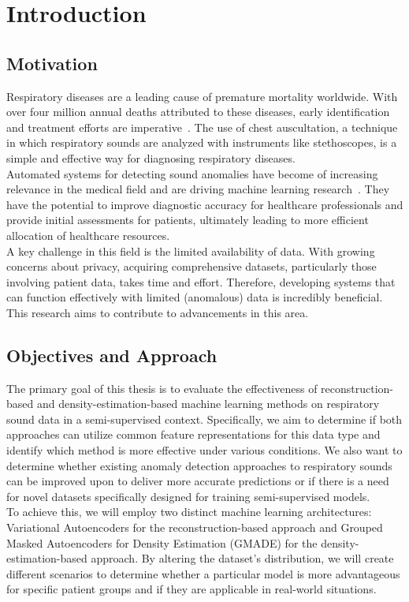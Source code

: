 \cleardoubleoddpage%
\chapter{Introduction}

\section{Motivation}
Respiratory diseases are a leading cause of premature mortality worldwide. With over four million annual deaths attributed to these diseases, early identification and treatment efforts are imperative~\cite{ferkol2014global}. The use of chest auscultation, a technique in which respiratory sounds are analyzed with instruments like stethoscopes, is a simple and effective way for diagnosing respiratory diseases.\\
Automated systems for detecting sound anomalies have become of increasing relevance in the medical field and are driving machine learning research~\cite{bohadana2014fundamentals}. They have the potential to improve diagnostic accuracy for healthcare professionals and provide initial assessments for patients, ultimately leading to more efficient allocation of healthcare resources.\\
A key challenge in this field is the limited availability of data. With growing concerns about privacy, acquiring comprehensive datasets, particularly those involving patient data, takes time and effort. Therefore, developing systems that can function effectively with limited (anomalous) data is incredibly beneficial. This research aims to contribute to advancements in this area.


\section{Objectives and Approach}

The primary goal of this thesis is to evaluate the effectiveness of reconstruction-based and density-estimation-based machine learning methods on respiratory sound data in a semi-supervised context. Specifically, we aim to determine if both approaches can utilize common feature representations for this data type and identify which method is more effective under various conditions. We also want to determine whether existing anomaly detection approaches to respiratory sounds can be improved upon to deliver more accurate predictions or if there is a need for novel datasets specifically designed for training semi-supervised models. \\
To achieve this, we will employ two distinct machine learning architectures: Variational Autoencoders for the reconstruction-based approach and Grouped Masked Autoencoders for Density Estimation (GMADE) for the density-estimation-based approach. By altering the dataset's distribution, we will create different scenarios to determine whether a particular model is more advantageous for specific patient groups and if they are applicable in real-world situations.

